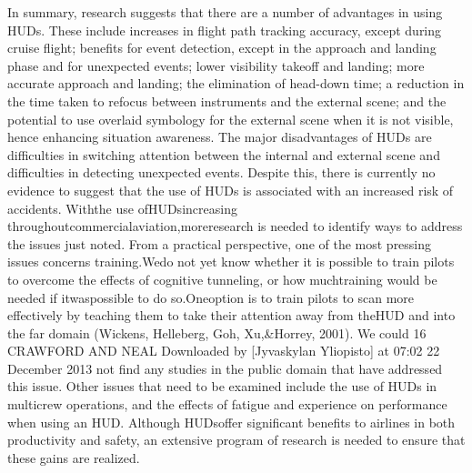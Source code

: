 \documentclass[utf8,bachelor,manualbib]{gradu3}
\begin{document}
In summary, research suggests that there are a number of advantages in using
HUDs. These include increases in flight path tracking accuracy, except during
cruise flight; benefits for event detection, except in the approach and landing
phase and for unexpected events; lower visibility takeoff and landing; more accurate
approach and landing; the elimination of head-down time; a reduction in
the time taken to refocus between instruments and the external scene; and the
potential to use overlaid symbology for the external scene when it is not visible,
hence enhancing situation awareness. The major disadvantages of HUDs are difficulties
in switching attention between the internal and external scene and difficulties
in detecting unexpected events. Despite this, there is currently no evidence
to suggest that the use of HUDs is associated with an increased risk of
accidents.
Withthe use ofHUDsincreasing throughoutcommercialaviation,moreresearch
is needed to identify ways to address the issues just noted. From a practical perspective,
one of the most pressing issues concerns training.Wedo not yet know whether
it is possible to train pilots to overcome the effects of cognitive tunneling, or how
muchtraining would be needed if itwaspossible to do so.Oneoption is to train pilots
to scan more effectively by teaching them to take their attention away from theHUD
and into the far domain (Wickens, Helleberg, Goh, Xu,\&Horrey, 2001). We could
16 CRAWFORD AND NEAL
Downloaded by [Jyvaskylan Yliopisto] at 07:02 22 December 2013
not find any studies in the public domain that have addressed this issue. Other issues
that need to be examined include the use of HUDs in multicrew operations, and the
effects of fatigue and experience on performance when using an HUD. Although
HUDsoffer significant benefits to airlines in both productivity and safety, an extensive
program of research is needed to ensure that these gains are realized. \citep{crawfordneal2006}
\end{document}

